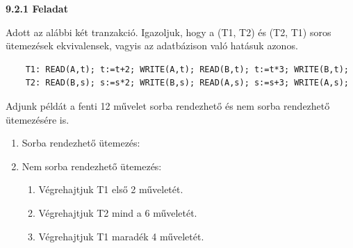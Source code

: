 \documentclass[a4paper,11.5pt, table]{article}
\begin{document}
	\textbf{9.2.1 Feladat}
	
	Adott az alábbi két tranzakció. Igazoljuk, hogy a (T1, T2) és (T2, T1) soros ütemezések ekvivalensek, vagyis az adatbázison való hatásuk azonos.
	\begin{lstlisting}
	T1: READ(A,t); t:=t+2; WRITE(A,t); READ(B,t); t:=t*3; WRITE(B,t);
	T2: READ(B,s); s:=s*2; WRITE(B,s); READ(A,s); s:=s+3; WRITE(A,s);
	\end{lstlisting}
	Adjunk példát a fenti 12 művelet sorba rendezhető és nem sorba rendezhető ütemezésére is.
	\begin{enumerate}[label = \alph*)]
		\item Sorba rendezhető ütemezés:
		\item Nem sorba rendezhető ütemezés:
		\begin{enumerate}
			\item Végrehajtjuk T1 első 2 műveletét.
			\item Végrehajtjuk T2 mind a 6 műveletét.
			\item Végrehajtjuk T1 maradék 4 műveletét.
		\end{enumerate}
	\end{enumerate} 

	
\end{document}
